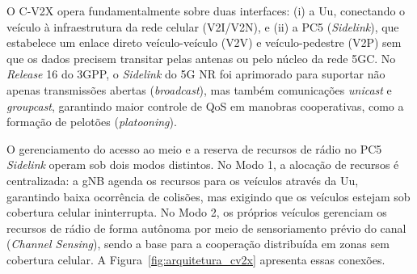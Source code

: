 O \gls{C-V2X} opera fundamentalmente sobre duas interfaces: (i) a \gls{Uu}, conectando o veículo à infraestrutura da rede celular (\gls{V2I}/\gls{V2N}), e (ii) a \gls{PC5} (\textit{Sidelink}), que estabelece um enlace direto veículo-veículo (\gls{V2V}) e veículo-pedestre (\gls{V2P}) sem que os dados precisem transitar pelas antenas ou pelo núcleo da rede \gls{5GC}. No \textit{Release} 16 do \gls{3GPP}, o \textit{Sidelink} do \gls{5G} \gls{NR} foi aprimorado para suportar não apenas transmissões abertas (\textit{broadcast}), mas também comunicações \textit{unicast} e \textit{groupcast}, garantindo maior controle de \gls{QoS} em manobras cooperativas, como a formação de pelotões (\textit{platooning}).

O gerenciamento do acesso ao meio e a reserva de recursos de rádio no \gls{PC5} \textit{Sidelink} operam sob dois modos distintos. No Modo 1, a alocação de recursos é centralizada: a \gls{gNB} agenda os recursos para os veículos através da \gls{Uu}, garantindo baixa ocorrência de colisões, mas exigindo que os veículos estejam sob cobertura celular ininterrupta. No Modo 2, os próprios veículos gerenciam os recursos de rádio de forma autônoma por meio de sensoriamento prévio do canal (\textit{Channel Sensing}), sendo a base para a cooperação distribuída em zonas sem cobertura celular. A Figura~\ref{fig:arquitetura_cv2x} apresenta essas conexões.


